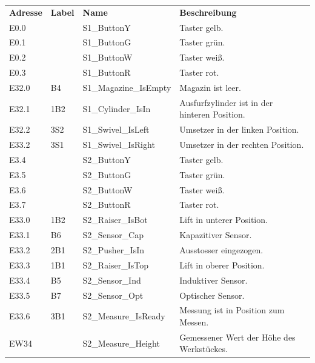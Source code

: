 \documentclass[11pt,a4paper,ngerman]{article}
\begin{document}
\begin{center}
	\setlength\extrarowheight{4pt}
	\small
	\begin{tabularx}{\textwidth}{|p{1.5cm}|p{1cm}|p{4cm}|X|}
		\hline
		\rowcolor{tublau}
		\multicolumn{4}{|c|}{\bf \color{white} \large Eingänge}\\
		\hline\hline
		\rowcolor{gray!80}
		\bf Adresse & \bf Label & \bf Name & \bf Beschreibung \\
		\hline\hline
		E0.0  &     & S1\_ButtonY & Taster gelb.\\
		E0.1  &     & S1\_ButtonG & Taster grün.\\
		E0.2  &     & S1\_ButtonW & Taster weiß.\\
		E0.3  &     & S1\_ButtonR & Taster rot.\\
		E32.0 & B4  & S1\_Magazine\_IsEmpty & Magazin ist leer.\\
		E32.1 & 1B2 & S1\_Cylinder\_IsIn & Ausfurfzylinder ist in der hinteren Position.\\
		E32.2 & 3S2 & S1\_Swivel\_IsLeft & Umsetzer in der linken Position.\\
		E33.2 & 3S1 & S1\_Swivel\_IsRight & Umsetzer in der rechten Position.\\
		\hline
		E3.4  &     & S2\_ButtonY & Taster gelb.\\
		E3.5  &     & S2\_ButtonG & Taster grün.\\
		E3.6  &     & S2\_ButtonW & Taster weiß.\\
		E3.7  &     & S2\_ButtonR & Taster rot.\\
		E33.0 & 1B2 & S2\_Raiser\_IsBot & Lift in unterer Position.\\
		E33.1 & B6  & S2\_Sensor\_Cap & Kapazitiver Sensor.\\
		E33.2 & 2B1 & S2\_Pusher\_IsIn & Ausstosser eingezogen.\\
		E33.3 & 1B1 & S2\_Raiser\_IsTop & Lift in oberer Position.\\
		E33.4 & B5  & S2\_Sensor\_Ind & Induktiver Sensor.\\
		E33.5 & B7  & S2\_Sensor\_Opt & Optischer Sensor.\\
		E33.6 & 3B1 & S2\_Measure\_IsReady & Messung ist in Position zum Messen.\\
		EW34  &     & S2\_Measure\_Height & Gemessener Wert der Höhe des Werkstückes.\\
		\hline
	\end{tabularx}
	
	\medskip
	

\end{center}
\end{document}
